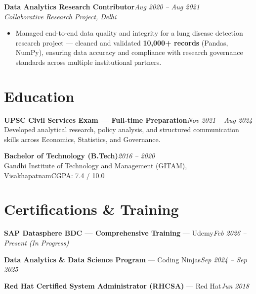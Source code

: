 \documentclass[10pt, letterpaper]{article}
\newcommand{\role}[3]{%
  \vspace{2pt}%
  {\bfseries #1}\hfill{\small\color{muted}\textit{#3}}\\[-2pt]%
  {\small\color{muted}\textit{#2}}%
}
\begin{document}
\role{Data Analytics Research Contributor}{Collaborative Research Project, Delhi}{Aug 2020 – Aug 2021}

\begin{itemize}
  \item Managed end-to-end data quality and integrity for a lung disease detection research project — cleaned and validated \textbf{10,000+ records} (Pandas, NumPy), ensuring data accuracy and compliance with research governance standards across multiple institutional partners.
\end{itemize}

\section{Education}

{\bfseries UPSC Civil Services Exam — Full-time Preparation}\hfill{\small\color{muted}\textit{Nov 2021 – Aug 2024}}\\
{\small\color{muted}Developed analytical research, policy analysis, and structured communication skills across Economics, Statistics, and Governance.}

\vspace{2pt}
{\bfseries Bachelor of Technology (B.Tech)}\hfill{\small\color{muted}\textit{2016 – 2020}}\\
{\small\color{muted}Gandhi Institute of Technology and Management (GITAM), Visakhapatnam\hfill CGPA: 7.4 / 10.0}

\section{Certifications \& Training}

{\bfseries SAP Datasphere BDC — Comprehensive Training} — Udemy\hfill{\small\color{muted}\textit{Feb 2026 – Present \emph{(In Progress)}}}

\vspace{1pt}
{\bfseries Data Analytics \& Data Science Program} — Coding Ninjas\hfill{\small\color{muted}\textit{Sep 2024 – Sep 2025}}

\vspace{1pt}
{\bfseries Red Hat Certified System Administrator (RHCSA)} — Red Hat\hfill{\small\color{muted}\textit{Jun 2018}}

\end{document}
